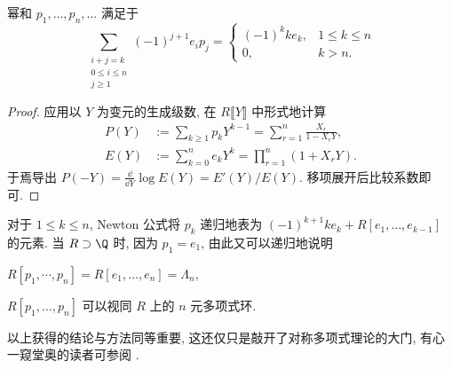 \begin{theorem}[Newton 公式] 
	幂和 $p_1, \ldots, p_n, \ldots$ 满足于
	\[ \sum_{\substack{i+j=k \\ 0 \leq i \leq n \\ j \geq 1}} (-1)^{j+1} e_i p_j =
	\begin{cases}
		(-1)^k k e_k, & 1 \leq k \leq n \\
		0, & k > n.
	\end{cases}\]
\end{theorem}
\begin{proof}
	应用以 $Y$ 为变元的生成级数, 在 $R\llbracket Y \rrbracket$ 中形式地计算
	\begin{align*}
		P(Y) & := \sum_{k \geq 1} p_k Y^{k-1} = \sum_{r=1}^n \frac{X_r}{1 - X_r Y}, \\
		E(Y) & := \sum_{k=0}^n e_k Y^k = \prod_{r=1}^n (1 + X_r Y).
	\end{align*}
	于焉导出 $P(-Y) = \frac{\dd}{\dd Y} \log E(Y) = E'(Y)/E(Y)$. 移项展开后比较系数即可.
\end{proof}
对于 $1 \leq k \leq n$, Newton 公式将 $p_k$ 递归地表为 $(-1)^{k+1} k e_k + R[e_1, \ldots, e_{k-1}]$ 的元素. 当 $R \supset \Q$ 时, 因为 $p_1 = e_1$, 由此又可以递归地说明
\begin{compactitem}
	\item $R[p_1, \cdots, p_n] = R[e_1, \ldots, e_n] = \Lambda_n$,
	\item $R[p_1, \ldots, p_n]$ 可以视同 $R$ 上的 $n$ 元多项式环.
\end{compactitem}

以上获得的结论与方法同等重要, 这还仅只是敲开了对称多项式理论的大门, 有心一窥堂奥的读者可参阅 \cite{Mac95}.


